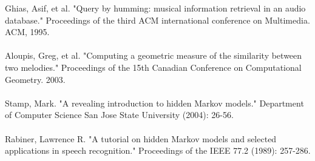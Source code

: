 \documentclass{article}
\begin{document}
	Ghias, Asif, et al. "Query by humming: musical information retrieval in an audio database." Proceedings of the third ACM 
	international conference on Multimedia. ACM, 1995.
	\\ \\
	Aloupis, Greg, et al. "Computing a geometric measure of the similarity between two melodies." Proceedings of the 15th 
	Canadian Conference on Computational Geometry. 2003.
	\\ \\
	Stamp, Mark. "A revealing introduction to hidden Markov models." Department of Computer Science San Jose State University (2004): 26-56.
	\\ \\
	Rabiner, Lawrence R. "A tutorial on hidden Markov models and selected applications in speech recognition." Proceedings of 
	the IEEE 77.2 (1989): 257-286.
	\\
\end{document}
